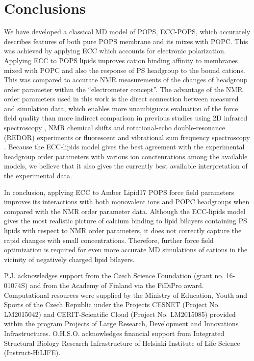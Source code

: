 \documentclass[journal=jpcbfk,manuscript=article]{achemso}
\begin{document}
 
\section{Conclusions} 


We have developed a classical MD model of POPS, ECC-POPS, 
which accurately describes features of both pure POPS membrane and its mixes with POPC. 
This was achieved by applying ECC which accounts for electronic polarization. 
Applying ECC to POPS lipids improves cation binding affinity to membranes
mixed with POPC and also the response of PS headgroup to the bound cations.
This was compared to accurate NMR measurements of the changes of headgroup order parameter within the ``electrometer concept''. 
The advantage of the NMR order parameters used in this work is the direct connection between
measured and simulation data, which enables more unambiguous evaluation of the force field quality \cite{catte16,ollila16}
than more indirect comparison in previous studies using 2D infrared spectroscopy \cite{valentine18}, NMR chemical shifts and
rotational-echo double-resonance (REDOR) experiments \cite{hallock18} or fluorescent and vibrational sum frequency spectroscopy \cite{melcrova16}.
Because the ECC-lipids model gives the best agreement with the experimental headgroup order parameters
with various ion conctenrations among the available models, we believe that it also gives the currently best available
interpretation of the experimental data. 

In conclusion, applying ECC to Amber Lipid17 POPS force field parameters improves its
interactions with both monovalent ions and POPC headgroups when compared with the NMR order parameter data.
Although the ECC-lipids model gives the most realistic picture of calcium binding to
lipid bilayers containing PS lipids with respect to NMR order parameters, it does not
correctly capture the rapid changes with small concentrations. 
Therefore, further force field optimization is required for even more accurate MD simulations of cations
in the vicinity of negatively charged lipid bilayers.



\listoftodos


\begin{acknowledgement} 
P.J. acknowledges support from the Czech Science Foundation (grant no. 16-01074S)  
and from the Academy of Finland via the FiDiPro award. 
Computational resources were supplied by the Ministry of Education, Youth and Sports 
of the Czech Republic under the Projects CESNET (Project No. LM2015042) and CERIT-Scientific 
Cloud (Project No. LM2015085) provided within the program Projects of Large Research, 
Development and Innovations Infrastructures. 
O.H.S.O. acknowledges financial support from 
Integrated Structural Biology Research Infrastructure of 
Helsinki Institute of Life Science (Instruct-HiLIFE). 
\end{acknowledgement} 
 
\end{document}
